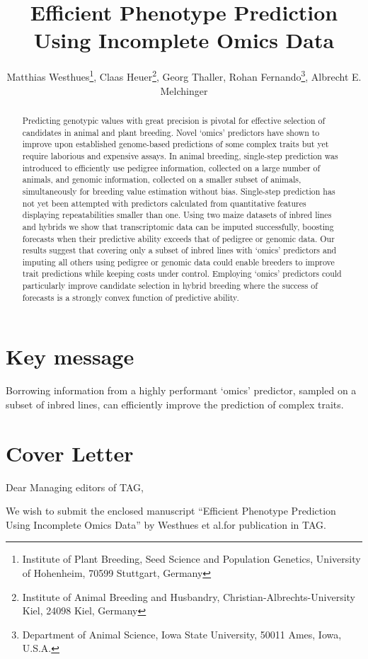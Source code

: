\documentclass[12pt,titlepage]{article}
\title{Efficient Phenotype Prediction Using Incomplete Omics Data}
\author{
  Matthias Westhues\thanks{Institute of Plant Breeding, Seed Science and Population Genetics, University of Hohenheim, 70599 Stuttgart, Germany},
  Claas Heuer\thanks{Institute of Animal Breeding and Husbandry, Christian-Albrechts-University Kiel, 24098 Kiel, Germany},
  Georg Thaller\samethanks[2],
  Rohan Fernando\thanks{Department of Animal Science, Iowa State University, 50011 Ames, Iowa, U.S.A.},
  Albrecht E. Melchinger\samethanks[1]
}
\begin{document}
\maketitle
\doublespacing
\linenumbers



\section{Key message}
Borrowing information from a highly performant `omics' predictor, sampled on a
subset of inbred lines, can efficiently improve the prediction of complex
traits.





\begin{abstract}
Predicting genotypic values with great precision is pivotal for effective
selection of candidates in animal and plant breeding.
Novel `omics' predictors have shown to improve upon established genome-based
predictions of some complex traits but yet require laborious and expensive
assays.
In animal breeding, single-step prediction was introduced to efficiently use
pedigree information, collected on a large number of animals, and genomic
information, collected on a smaller subset of animals, simultaneously for breeding
value estimation without bias.
Single-step prediction has not yet been attempted with predictors calculated from
quantitative features displaying repeatabilities smaller than one.
Using two maize datasets of inbred lines and hybrids we show that transcriptomic
data can be imputed successfully, boosting forecasts when their predictive
ability exceeds that of pedigree or genomic data.
Our results suggest that covering only a subset of inbred lines with `omics'
predictors and imputing all others using pedigree or genomic data could enable
breeders to improve trait predictions while keeping costs under control.
Employing `omics' predictors could particularly improve candidate selection in
hybrid breeding where the success of forecasts is a strongly convex function of
predictive ability.
\end{abstract}


\section{Cover Letter}
Dear Managing editors of TAG,

We wish to submit the enclosed manuscript 
``Efficient Phenotype Prediction Using Incomplete Omics Data'' by Westhues et 
al.\@ for publication in TAG.
\end{document}
